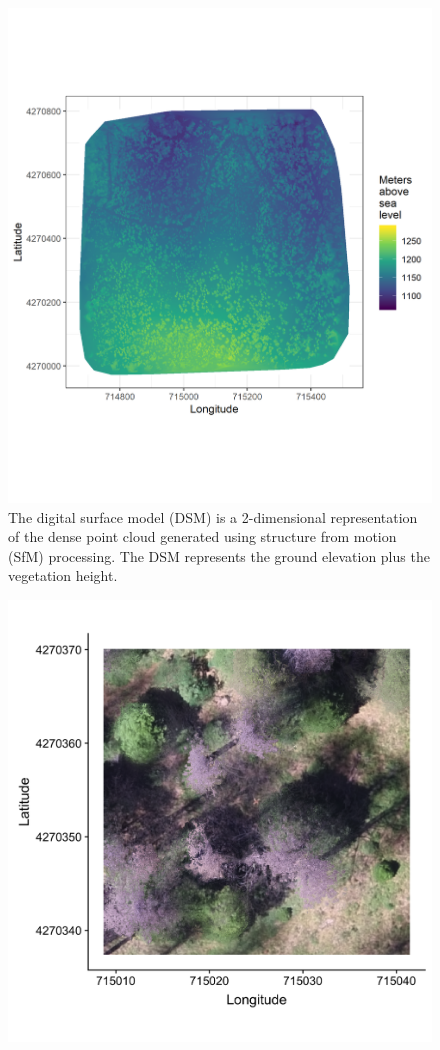 \documentclass[twoside,12pt,final]{ucthesis-CA2012}
\begin{document}
\begin{ucmainmatter}
\begin{figure}
\includegraphics[width=6.00000in]{figure/chap02/eldo_3k_3_dsm.png}
\caption{The digital surface model (DSM) is a 2-dimensional
representation of the dense point cloud generated using structure from
motion (SfM) processing. The DSM represents the ground elevation plus
the vegetation height.}
\end{figure}
\begin{figure}
\centering
\includegraphics[width=6.00000in]{figure/chap02/eldo_3k_3_2_ortho-rgb.png}

\end{figure}
\end{ucmainmatter}
\end{document}
